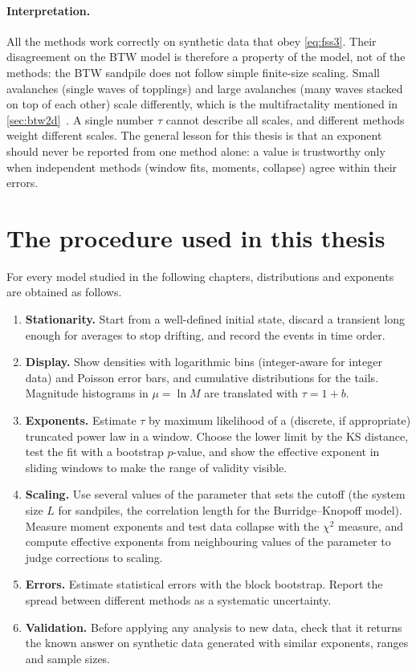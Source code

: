 \paragraph{Interpretation.} All the methods work correctly on synthetic data that obey \cref{eq:fss3}. Their disagreement on the BTW model is
therefore a property of the model, not of the methods: the BTW sandpile does not follow simple finite-size scaling. Small avalanches (single waves of
topplings) and large avalanches (many waves stacked on top of each other) scale differently, which is the multifractality mentioned in
\cref{sec:btw2d}~\cite{Tebaldi1999}. A single number $\tau$ cannot describe all scales, and different methods weight different scales. The general
lesson for this thesis is that an exponent should never be reported from one method alone: a value is trustworthy only when independent methods
(window fits, moments, collapse) agree within their errors.

\section{The procedure used in this thesis}
\label{sec:protocol}

For every model studied in the following chapters, distributions and exponents are obtained as follows.
\begin{enumerate}
  \item \textbf{Stationarity.} Start from a well-defined initial state, discard a transient long enough for averages to stop drifting, and record
    the events in time order.
  \item \textbf{Display.} Show densities with logarithmic bins (integer-aware for integer data) and Poisson error bars, and cumulative distributions
    for the tails. Magnitude histograms in $\mu=\ln M$ are translated with $\tau = 1+b$.
  \item \textbf{Exponents.} Estimate $\tau$ by maximum likelihood of a (discrete, if appropriate) truncated power law in a window. Choose the lower
    limit by the KS distance, test the fit with a bootstrap $p$-value, and show the effective exponent in sliding windows to make the range of validity
    visible.
  \item \textbf{Scaling.} Use several values of the parameter that sets the cutoff (the system size $L$ for sandpiles, the correlation length for the
    Burridge--Knopoff model). Measure moment exponents and test data collapse with the $\chi^2$ measure, and compute effective exponents from neighbouring
    values of the parameter to judge corrections to scaling.
  \item \textbf{Errors.} Estimate statistical errors with the block bootstrap. Report the spread between different methods as a systematic uncertainty.
  \item \textbf{Validation.} Before applying any analysis to new data, check that it returns the known answer on synthetic data generated with similar
    exponents, ranges and sample sizes.
\end{enumerate}
